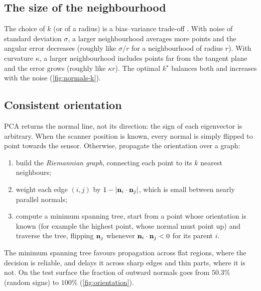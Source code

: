 \subsection{The size of the neighbourhood}

The choice of $k$ (or of a radius) is a bias--variance trade-off \citep{Mitra2003}. With noise of
standard deviation $\sigma$, a larger neighbourhood averages more points and the angular error
decreases (roughly like $\sigma/r$ for a neighbourhood of radius $r$). With curvature $\kappa$, a
larger neighbourhood includes points far from the tangent plane and the error grows (roughly like
$\kappa r$). The optimal $k^\star$ balances both and increases with the noise
(\cref{fig:normals-k}).


\subsection{Consistent orientation}

PCA returns the normal line, not its direction: the sign of each eigenvector is arbitrary. When the
scanner position is known, every normal is simply flipped to point towards the sensor. Otherwise,
\citet{Hoppe1992} propagate the orientation over a graph:
\begin{enumerate}
  \item build the \emph{Riemannian graph}, connecting each point to its $k$ nearest neighbours;
  \item weight each edge $(i,j)$ by $1-\left\lvert \mathbf{n}_i\cdot\mathbf{n}_j\right\rvert$, which is small between nearly
  parallel normals;
  \item compute a minimum spanning tree, start from a point whose orientation is known (for
  example the highest point, whose normal must point up) and traverse the tree, flipping $\mathbf{n}_j$
  whenever $\mathbf{n}_i\cdot\mathbf{n}_j<0$ for its parent $i$.
\end{enumerate}
The minimum spanning tree favours propagation across flat regions, where the decision is reliable,
and delays it across sharp edges and thin parts, where it is not. On the test surface the fraction
of outward normals goes from $50.3\%$ (random signs) to $100\%$ (\cref{fig:orientation}).

